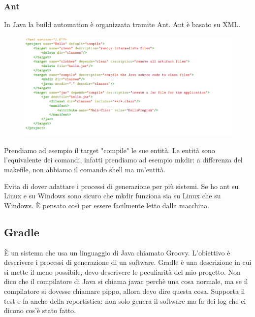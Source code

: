 \subsubsection{Ant}
In Java la build automation è organizzata tramite Ant. 
Ant è basato su XML. 

\begin{figure}[H]
	\centering
	 \includegraphics[scale=0.7]{img/ant.png}
\end{figure}

\noindent Prendiamo ad esempio il target "compile" le sue entità.
Le entità sono l'equivalente dei comandi, infatti prendiamo ad esempio mkdir: a differenza del makefile, non abbiamo il comando shell ma un'entità. 

\noindent Evita di dover adattare i processi di generazione per più sistemi. Se ho ant su Linux e su Windows sono sicuro che mkdir funziona sia su Linux che su Windows.
È pensato così per essere facilmente letto dalla macchina. 


\subsection{Gradle}
È un sistema che usa un linguaggio di Java chiamato Groovy. L'obiettivo è descrivere i processi di generazione di un software. 
Gradle è una descrizione in cui si mette il meno possibile, devo descrivere le peculiarità del mio progetto. Non dico che il compilatore di Java si chiama javac perchè una cosa normale, ma se il compilatore si dovesse chiamare pippo, allora devo dire questa cosa. Supporta il test e fa anche della reportistica: non solo genera il software ma fa dei log che ci dicono cos'è stato fatto. 

